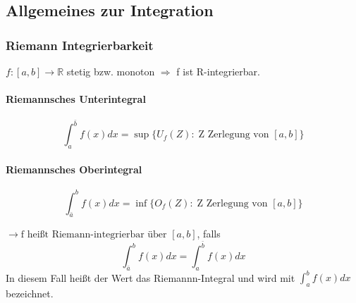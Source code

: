 \documentclass[12pt,a4paper]{article}%
\numberwithin{equation}{section}
\newcommand{\R}{\mathbb{R}} %
\newcommand{\subsubsubsection}{\paragraph}
\begin{document}
\subsection{Allgemeines zur Integration}
\subsubsection{Riemann Integrierbarkeit}
$f:[a,b] \rightarrow \R$ stetig bzw. monoton \newline
$\Rightarrow$ f ist R-integrierbar.

\subsubsubsection{Riemannsches Unterintegral}
\begin{equation}
\int_{a}^{\bar{b}} f(x) dx = \sup\{U_f(Z): \; \text{Z Zerlegung von }[a,b]\}
\end{equation}


\subsubsubsection{Riemannsches Oberintegral}
\begin{equation}
\int_{\bar{a}}^{b} f(x) dx = \inf\{O_f(Z): \; \text{Z Zerlegung von }[a,b]\}
\end{equation}

$\rightarrow \text{f heißt Riemann-integrierbar über }[a,b]$, falls
\begin{equation}
\int_{\bar{a}}^{b} f(x) dx = \int_a^{\bar{b}} f(x) dx
\end{equation}
\newline
In diesem Fall heißt der Wert das Riemannn-Integral und wird mit $\int_a^b f(x)dx$ bezeichnet.
\end{document}
